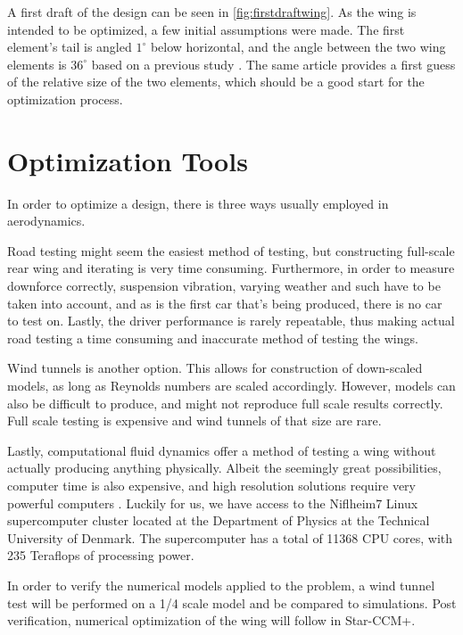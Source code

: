     A first draft of the design can be seen in \ref{fig:firstdraftwing}. As the wing is intended to be optimized, a few initial assumptions were made. The first element's tail is angled $1^\circ$ below horizontal, and the angle between the two wing elements is $36^\circ$ based on a previous study \cite{winginitialangle}. The same article provides a first guess of the relative size of the two elements, which should be a good start for the optimization process.

  \section{Optimization Tools}

    In order to optimize a design, there is three ways usually employed in aerodynamics.

    Road testing might seem the easiest method of testing, but constructing full-scale rear wing and iterating is very time consuming. Furthermore, in order to measure downforce correctly, suspension vibration, varying weather and such have to be taken into account, and as is the first car that's being produced, there is no car to test on. Lastly, the driver performance is rarely repeatable, thus making actual road testing a time consuming and inaccurate method of testing the wings.

    Wind tunnels is another option. This allows for construction of down-scaled models, as long as Reynolds numbers are scaled accordingly. However, models can also be difficult to produce, and might not reproduce full scale results correctly. Full scale testing is expensive and wind tunnels of that size are rare.

    Lastly, computational fluid dynamics offer a method of testing a wing without actually producing anything physically. Albeit the seemingly great possibilities, computer time is also expensive, and high resolution solutions require very powerful computers \cite{jkatz}. Luckily for us, we have access to the Niflheim7 Linux supercomputer cluster located at the Department of Physics at the Technical University of Denmark. The supercomputer has a total of 11368 CPU cores, with 235 Teraflops of processing power.

    In order to verify the numerical models applied to the problem, a wind tunnel test will be performed on a 1/4 scale model and be compared to simulations. Post verification, numerical optimization of the wing will follow in Star-CCM+.
